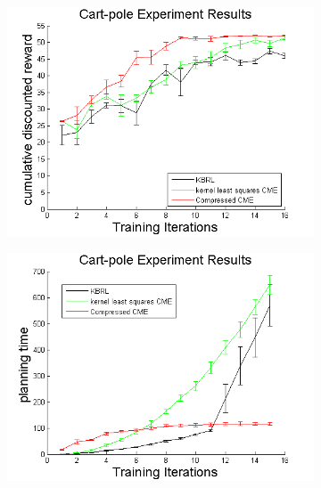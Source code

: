 \documentclass[letterpaper]{article}
\begin{document}
\begin{figure}[htb]
\centering
\begin{subfigure}[b]{0.3\textwidth}
\includegraphics[clip, width=\textwidth]{CPrewards.png}
\end{subfigure}
\begin{subfigure}[b]{0.3\textwidth}
\includegraphics[clip, width=\textwidth]{CPplanning.png}
\end{subfigure}
\begin{subfigure}[b]{0.3\textwidth}

\end{subfigure}
\end{figure}
\end{document}
